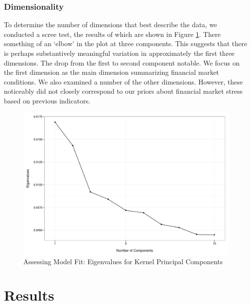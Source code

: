 \documentclass[]{article}
\begin{document}
\subsubsection{Dimensionality}\label{dimensionality}

To determine the number of dimensions that best describe the data, we
conducted a scree test, the results of which are shown in Figure
\ref{scree_plot}. There something of an `elbow' in the plot at three components.
This suggests that there is perhaps substantively meaningful variation in
approximately the first three dimensions. The drop from the first to
second component notable. We focus on the first dimension as the main
dimension summarizing financial market conditions. We also examined a number of the other dimensions. However, these noticeably did not closely correspond to our priors about financial market stress based on previous indicators.

\begin{figure}
    \caption{Assessing Model Fit: Eigenvalues for Kernel Principal Components}
    \label{scree_plot}
    \begin{center}
        \includegraphics[scale=0.5]{analysis/figures/scree_plot.pdf}
    \end{center}
\end{figure}

\section{Results}\label{results}
\end{document}
